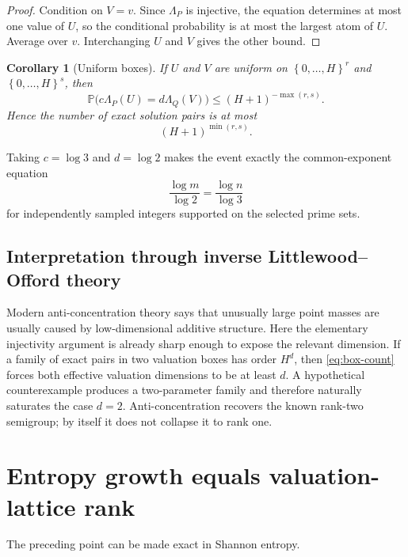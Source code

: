 \documentclass[11pt,oneside]{article}
\newtheorem{corollary}[theorem]{Corollary}
\theoremstyle{definition}
\theoremstyle{remark}
\newcommand{\Prob}{\mathbb{P}}
\newcommand{\set}[1]{\left\{#1\right\}}
\begin{document}
\begin{proof}
Condition on $V=v$.  Since $\Lambda_P$ is injective, the equation determines at most one value of $U$, so the conditional probability is at most the largest atom of $U$.  Average over $v$.  Interchanging $U$ and $V$ gives the other bound.
\end{proof}

\begin{corollary}[Uniform boxes]
\label{cor:box-count}
If $U$ and $V$ are uniform on $\set{0,\dots,H}^r$ and $\set{0,\dots,H}^s$, then
\begin{equation}
 \Prob\bigl(c\Lambda_P(U)=d\Lambda_Q(V)\bigr)
 \le(H+1)^{-\max(r,s)}.
 \label{eq:box-prob}
\end{equation}
Hence the number of exact solution pairs is at most
\begin{equation}
 (H+1)^{\min(r,s)}.
 \label{eq:box-count}
\end{equation}
\end{corollary}

Taking $c=\log3$ and $d=\log2$ makes the event exactly the common-exponent equation
\[
 \frac{\log m}{\log2}=\frac{\log n}{\log3}
\]
for independently sampled integers supported on the selected prime sets.

\subsection{Interpretation through inverse Littlewood--Offord theory}

Modern anti-concentration theory says that unusually large point masses are usually caused by low-dimensional additive structure.  Here the elementary injectivity argument is already sharp enough to expose the relevant dimension.  If a family of exact pairs in two valuation boxes has order $H^d$, then \eqref{eq:box-count} forces both effective valuation dimensions to be at least $d$.  A hypothetical counterexample produces a two-parameter family and therefore naturally saturates the case $d=2$.  Anti-concentration recovers the known rank-two semigroup; by itself it does not collapse it to rank one.

\section{Entropy growth equals valuation-lattice rank}
\label{sec:entropy-rank}

The preceding point can be made exact in Shannon entropy.
\end{document}
